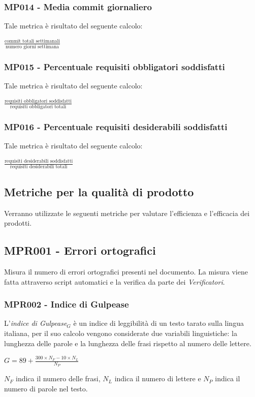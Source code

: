 \subsubsection{MP014 - Media commit giornaliero}
Tale metrica è risultato del seguente calcolo:
\begin{center}
	$\frac{\mbox{commit totali settimanali}}{\mbox{numero giorni settimana}}$
\end{center}


\subsubsection{MP015 - Percentuale requisiti obbligatori soddisfatti}
Tale metrica è risultato del seguente calcolo:
\begin{center}
	$\frac{\mbox{requisiti obbligatori soddisfatti}}{\mbox{requisiti obbligatori totali}}$
\end{center}

\subsubsection{MP016 - Percentuale requisiti desiderabili soddisfatti}
Tale metrica è risultato del seguente calcolo:
\begin{center}
	$\frac{\mbox{requisiti desiderabili soddisfatti}}{\mbox{requisiti desiderabili totali}}$
\end{center}




\subsection{Metriche per la qualità di prodotto}\label{metriche}
Verranno utilizzate le seguenti metriche per valutare l'efficienza e l'efficacia dei
prodotti.
\subsection{MPR001 - Errori ortografici}
Misura il numero di errori ortografici presenti nel documento. La misura viene fatta attraverso script automatici e la verifica da parte dei \textit{Verificatori}.

\subsubsection{MPR002 - Indice di Gulpease}
L’\textit{indice di Gulpease$_{G}$} è un indice di leggibilità di un testo tarato sulla lingua italiana, per il suo calcolo vengono considerate due variabili linguistiche: la lunghezza delle parole e la lunghezza delle frasi rispetto al numero delle lettere.
\begin{center}{$G=89+\frac{300\times N_F-10\times N_L}{N_P}$}\end{center}
$N_F$ indica il numero delle frasi, $N_L$ indica il numero di lettere e $N_P$ indica il numero di parole nel testo.

